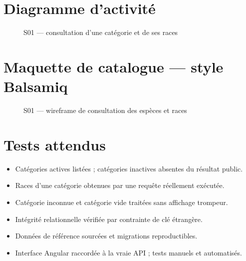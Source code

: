 \section{Diagramme d’activité}
\begin{figure}[H]\centering
\caption{S01 --- consultation d’une catégorie et de ses races}\label{fig:s01-act}\end{figure}

\section{Maquette de catalogue --- style Balsamiq}
\begin{figure}[H]\centering\resizebox{\textwidth}{!}{}
\caption{S01 --- wireframe de consultation des espèces et races}\label{fig:s01-wire}\end{figure}

\section{Tests attendus}
\begin{itemize}
\item Catégories actives listées ; catégories inactives absentes du résultat public.
\item Races d’une catégorie obtenues par une requête réellement exécutée.
\item Catégorie inconnue et catégorie vide traitées sans affichage trompeur.
\item Intégrité relationnelle vérifiée par contrainte de clé étrangère.
\item Données de référence sourcées et migrations reproductibles.
\item Interface Angular raccordée à la vraie API ; tests manuels et automatisés.
\end{itemize}

